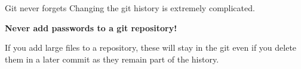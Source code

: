 \documentclass{setbeamer}
\begin{document}
\begin{frame}{Git never forgets}
    Changing the git history is extremely complicated.

    \begin{TUMBoxFill}[orange]{}{}
        \textbf{Never add passwords to a git repository!}
    \end{TUMBoxFill}

    \pause
    \vspace{3mm}

    \begin{TUMBoxFill}[orange]{}{}
        If you add large files to a repository, these will stay in the git even if you delete them in a later commit as they remain part of the history.
    \end{TUMBoxFill}

\end{frame}
\end{document}
